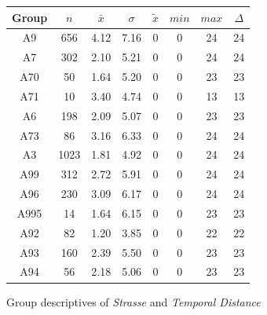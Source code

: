 \begin{figure}[ht!]
	\centering
	\begin{minipage}{0.5\textwidth}
		\tiny
		\centering
		\begin{tabular}{c|c|c|c|c|c|c|c}
			\toprule
			Group & $n$ & $\bar{x}$ & $\sigma$ & $\tilde{x}$ & $min$ & $max$ & $\Delta$ \\
			\midrule
			A9   & 656  & 4.12 & 7.16 & 0 & 0 & 24 & 24 \\ 
			A7   & 302  & 2.10 & 5.21 & 0 & 0 & 24 & 24 \\ 
			A70  & 50   & 1.64 & 5.20 & 0 & 0 & 23 & 23 \\ 
			A71  & 10   & 3.40 & 4.74 & 0 & 0 & 13 & 13 \\ 
			A6   & 198  & 2.09 & 5.07 & 0 & 0 & 23 & 23 \\ 
			A73  & 86   & 3.16 & 6.33 & 0 & 0 & 24 & 24 \\ 
			A3   & 1023 & 1.81 & 4.92 & 0 & 0 & 24 & 24 \\ 
			A99  & 312  & 2.72 & 5.91 & 0 & 0 & 24 & 24 \\ 
			A96  & 230  & 3.09 & 6.17 & 0 & 0 & 24 & 24 \\ 
			A995 & 14   & 1.64 & 6.15 & 0 & 0 & 23 & 23 \\ 
			A92  & 82   & 1.20 & 3.85 & 0 & 0 & 22 & 22 \\ 
			A93  & 160  & 2.39 & 5.50 & 0 & 0 & 23 & 23 \\ 
			A94  & 56   & 2.18 & 5.06 & 0 & 0 & 23 & 23 \\ 
			\bottomrule
		\end{tabular}
		\label{tbl:descriptives_arbis_matched_Strasse_TDist}
	\end{minipage}%
	\begin{minipage}{0.55\textwidth}
		\tiny
		\centering
		\vfill
		\label{fig:descriptives_arbis_matched_Strasse_TDist}
	\end{minipage}%
	\caption{Group descriptives of \textit{Strasse} and \textit{Temporal Distance}}
\end{figure}
